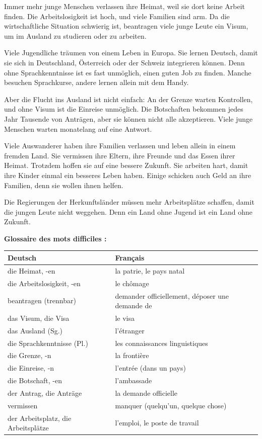 \documentclass[11pt]{article}
\begin{document}
\begin{textebox}
Immer mehr junge Menschen verlassen ihre Heimat, weil sie dort keine Arbeit finden. Die Arbeitslosigkeit ist hoch, und viele Familien sind arm. Da die wirtschaftliche Situation schwierig ist, beantragen viele junge Leute ein Visum, um im Ausland zu studieren oder zu arbeiten.

Viele Jugendliche träumen von einem Leben in Europa. Sie lernen Deutsch, damit sie sich in Deutschland, Österreich oder der Schweiz integrieren können. Denn ohne Sprachkenntnisse ist es fast unmöglich, einen guten Job zu finden. Manche besuchen Sprachkurse, andere lernen allein mit dem Handy.

Aber die Flucht ins Ausland ist nicht einfach: An der Grenze warten Kontrollen, und ohne Visum ist die Einreise unmöglich. Die Botschaften bekommen jedes Jahr Tausende von Anträgen, aber sie können nicht alle akzeptieren. Viele junge Menschen warten monatelang auf eine Antwort.

Viele Auswanderer haben ihre Familien verlassen und leben allein in einem fremden Land. Sie vermissen ihre Eltern, ihre Freunde und das Essen ihrer Heimat. Trotzdem hoffen sie auf eine bessere Zukunft. Sie arbeiten hart, damit ihre Kinder einmal ein besseres Leben haben. Einige schicken auch Geld an ihre Familien, denn sie wollen ihnen helfen.

Die Regierungen der Herkunftsländer müssen mehr Arbeitsplätze schaffen, damit die jungen Leute nicht weggehen. Denn ein Land ohne Jugend ist ein Land ohne Zukunft.
\end{textebox}

\textbf{Glossaire des mots difficiles :}

\begin{center}
\begin{tabularx}{\linewidth}{|X|X|}\hline
\rowcolor{popblueL} \textbf{Deutsch} & \textbf{Français} \\ \hline
die Heimat, -en & la patrie, le pays natal \\ \hline
die Arbeitslosigkeit, -en & le chômage \\ \hline
beantragen (trennbar) & demander officiellement, déposer une demande de \\ \hline
das Visum, die Visa & le visa \\ \hline
das Ausland (Sg.) & l'étranger \\ \hline
die Sprachkenntnisse (Pl.) & les connaissances linguistiques \\ \hline
die Grenze, -n & la frontière \\ \hline
die Einreise, -n & l'entrée (dans un pays) \\ \hline
die Botschaft, -en & l'ambassade \\ \hline
der Antrag, die Anträge & la demande officielle \\ \hline
vermissen & manquer (quelqu'un, quelque chose) \\ \hline
der Arbeitsplatz, die Arbeitsplätze & l'emploi, le poste de travail \\ \hline
\end{tabularx}
\end{center}
\end{document}
